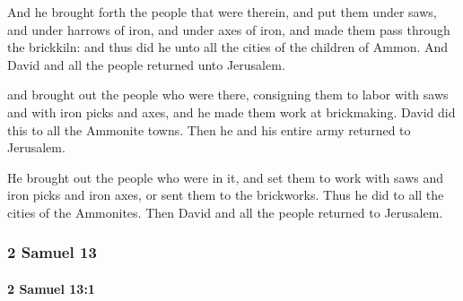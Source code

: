 			\begin{versebox}
					\item[BHS] 
					\item[ASV] And he brought forth the people that were therein, and put them under saws, and under harrows of iron, and under axes of iron, and made them pass through the brickkiln: and thus did he unto all the cities of the children of Ammon. And David and all the people returned unto Jerusalem.
					\item[NIV] and brought out the people who were there, consigning them to labor with saws and with iron picks and axes, and he made them work at brickmaking. David did this to all the Ammonite towns. Then he and his entire army returned to Jerusalem.
					\item[NRSV] He brought out the people who were in it, and set them to work with saws and iron picks and iron axes, or sent them to the brickworks. Thus he did to all the cities of the Ammonites. Then David and all the people returned to Jerusalem.
			\end{versebox}
	\subsubsection{2 Samuel 13} %
		\label{2SAMUEL-13}

		\paragraph{2 Samuel 13:1} %
			\label{2SAMUEL-13-1}

